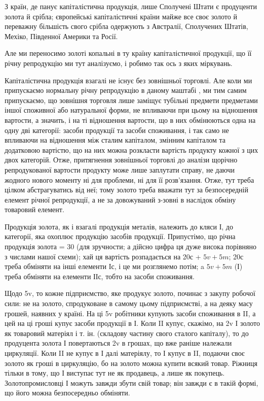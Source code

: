 З країн, де панує капіталістична продукція, лише Сполучені Штати
є продуценти золота й срібла; європейські капіталістичні країни майже
все своє золото й переважну більшість свого срібла одержують з
Австралії, Сполучених Штатів, Мехіко, Південної Америки та Росії.

Але ми переносимо золоті копальні в ту країну капіталістичної продукції,
що її річну репродукцію ми тут аналізуємо, і робимо так ось з
яких міркувань.

Капіталістична продукція взагалі не існує без зовнішньої торговлі.
Але коли ми припускаємо нормальну річну репродукцію в даному маштабі
, ми тим самим припускаємо, що зовнішня торговля лише заміщує
тубільні предмети предметами іншої споживної або натуральної форми, не
впливаючи при цьому на відношення вартости, а значить, і на ті відношення
вартости, що в них обмінюються одна на одну дві категорії:
засоби продукції та засоби споживання, і так само не впливаючи на
відношення між сталим капіталом, змінним капіталом та додатковою
вартістю, що на них можна розкласти вартість продукту кожної з цих
двох категорій. Отже, притягнення зовнішньої торговлі до аналізи щорічно
репродукованої вартости продукту може лише заплутати справу, не даючи
жодного нового моменту ні для проблеми, ні для її розв’язання. Отже,
тут треба цілком абстрагуватись від неї; тому золото треба вважати тут
за безпосередній елемент річної репродукції, а не за довожуваний з-зовні
в наслідок обміну товаровий елемент.

Продукція золота, як і взагалі продукція металів, належить до кляси І,
до категорії, яка охоплює продукцію засобів продукції. Припустімо, що
річна продукція золота = 30 (для зручности; а дійсно цифра ця дуже
висока порівняно з числами нашої схеми); хай ця вартість розпадається
на 20с + $5v + 5m$; 20с треба обміняти на інші елементи Іс, і це ми розглянемо
потім; a $5v + 5m$ (І) треба обміняти на елементи ІІс, тобто на
засоби споживання.

Щодо 5v, то кожне підприємство, яке продукує золото, починає з
закупу робочої сили: не на золото, спродуковане в самому цьому підприємстві,
а на деяку масу грошей, наявних у країні. На ці 5v робітники
купують засоби споживання в II, а цей на ці гроші купує засоби продукції
в І. Коли II купує, скажімо, на 2v І золото як товаровий
матеріял і т. ін. (складову частину свого сталого капіталу), то до продуцента
золота І повертаються 2v в грошах, що вже раніше належали
циркуляції. Коли II не купує в І далі матеріялу, то І купує в II, подаючи
своє золото як гроші в циркуляцію, бо на золото можна купити всякий
товар. Ріжниця тільки в тому, що І виступає тут не як продавець, а
лише як покупець. Золотопромисловці І можуть завжди збути свій товар;
він завжди є в такій формі, що його можна безпосередньо обміняти.

